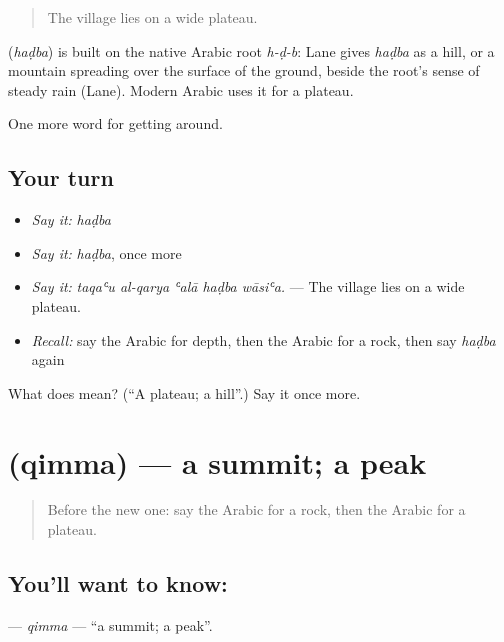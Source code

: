 \begin{quote}
The village lies on a wide plateau.
\end{quote}

\begin{cousinweb}
\textbf{} (\emph{haḍba}) is built on the native Arabic root \emph{h-ḍ-b}: Lane gives \emph{haḍba} as a hill, or a mountain spreading over the surface of the ground, beside the root's sense of steady rain (Lane). Modern Arabic uses it for a plateau.
\end{cousinweb}

\begin{grammarlens}[title={What you've built}]
One more word for getting around.
\end{grammarlens}

\subsection*{Your turn}
\begin{itemize}
\raggedright
  \item \emph{Say it:} \emph{haḍba}
  \item \emph{Say it:} \emph{haḍba}, once more
  \item \emph{Say it:} \emph{taqaʿu al-qarya ʿalā haḍba wāsiʿa.} — The village lies on a wide plateau.
  \item \emph{Recall:} say the Arabic for depth, then the Arabic for a rock, then say \emph{haḍba} again
\end{itemize}

\begin{tcolorbox}[breakable,colback=teal!4,colframe=teal!35!black,title={Before you move on}]
What does  mean? (\textquotedblleft{}A plateau; a hill\textquotedblright{}.) Say it once more.
\end{tcolorbox}
\section[\texorpdfstring{\ar{قمة} (qimma)}{قمة (qimma)}]{ (qimma) — a summit; a peak}

\label{lesson:AR-C472-qimma}



\begin{quote}
Before the new one: say the Arabic for a rock, then the Arabic for a plateau.
\end{quote}

\subsection*{You'll want to know: }
\textbf{} — \emph{qimma} — \textquotedblleft{}a summit; a peak\textquotedblright{}.

